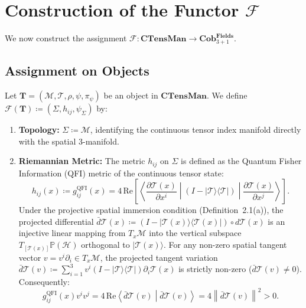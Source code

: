 \documentclass[11pt,a4paper,reqno]{amsart}
\theoremstyle{definition}
\numberwithin{equation}{section}
\newcommand{\CTens}{\mathbf{CTensMan}}
\newcommand{\Cob}{\mathbf{Cob}_{3+1}^{\mathbf{Fields}}}
\newcommand{\QFI}{\mathrm{QFI}}
\begin{document}
\section{Construction of the Functor \texorpdfstring{$\mathcal{F}$}{F}}
\label{sec:functor_construction}

We now construct the assignment $\mathcal{F} : \CTens \to \Cob$.

\subsection{Assignment on Objects}
Let $\mathbf{T} = (\mathcal{M}, \mathcal{T}, \rho, \psi, \pi_\psi)$ be an object in $\CTens$. 
We define $\mathcal{F}(\mathbf{T}) \coloneqq (\Sigma, h_{ij}, \psi_\Sigma)$ by:
\begin{enumerate}
    \item \textbf{Topology:} $\Sigma \coloneqq \mathcal{M}$, identifying the continuous tensor index manifold directly with the spatial 3-manifold.
    \item \textbf{Riemannian Metric:} The metric $h_{ij}$ on $\Sigma$ is defined as the Quantum Fisher Information (QFI) metric of the continuous tensor state:
    \begin{equation}
        h_{ij}(x) \coloneqq g^{\QFI}_{ij}(x) = 4 \, \mathrm{Re} \left[ \left\langle \frac{\partial \mathcal{T}(x)}{\partial x^i} \middle| (I - |\mathcal{T}\rangle\langle\mathcal{T}|) \middle| \frac{\partial \mathcal{T}(x)}{\partial x^j} \right\rangle \right]. \label{eq:qfi_metric}
    \end{equation}
    Under the projective spatial immersion condition (Definition~2.1(a)), the projected differential $\bar{d}\mathcal{T}(x) \coloneqq (I - |\mathcal{T}(x)\rangle\langle\mathcal{T}(x)|) \circ d\mathcal{T}(x)$ is an injective linear mapping from $T_x\mathcal{M}$ into the vertical subspace $T_{[\mathcal{T}(x)]}\mathbb{P}(\mathcal{H})$ orthogonal to $|\mathcal{T}(x)\rangle$. For any non-zero spatial tangent vector $v = v^i \partial_i \in T_x\mathcal{M}$, the projected tangent variation $\bar{d}\mathcal{T}(v) \coloneqq \sum_{i=1}^3 v^i (I - |\mathcal{T}\rangle\langle\mathcal{T}|) \partial_i\mathcal{T}(x)$ is strictly non-zero ($\bar{d}\mathcal{T}(v) \neq 0$). Consequently:
    \begin{equation}
        g^{\QFI}_{ij}(x) v^i v^j = 4 \, \mathrm{Re} \left\langle \bar{d}\mathcal{T}(v) \middle| \bar{d}\mathcal{T}(v) \right\rangle = 4 \left\| \bar{d}\mathcal{T}(v) \right\|^2 > 0.

\end{equation}
\end{enumerate}
\end{document}
